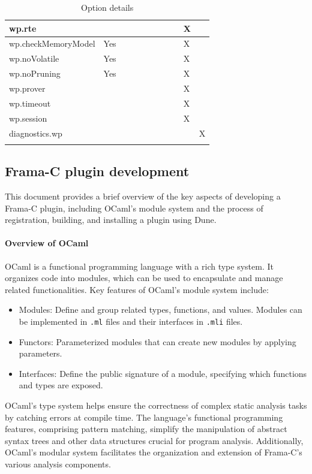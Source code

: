 \documentclass[10pt]{article}
\begin{document}
\begin{singlespace}
\begin{longtable}[H]{|l|l|l|l|p{0.2cm}|p{0.2cm}|p{0.2cm}|p{0.2cm}|p{0.2cm}|p{0.2cm}|p{0.2cm}|}
    wp.rte 									&     &   &   &   &   &   &   &   & X &   	\\ \hline
    wp.checkMemoryModel 					& Yes &   &   &   &   &   &   &   & X &   	\\ \hline
    wp.noVolatile 							& Yes &   &   &   &   &   &   &   & X &   	\\ \hline
    wp.noPruning 								& Yes &   &   &   &   &   &   &   & X &   	\\ \hline
    wp.prover 								&     &   &   &   &   &   &   &   & X &   	\\ \hline
    wp.timeout 								&     &   &   &   &   &   &   &   & X &   	\\ \hline
    wp.session 								&     &   &   &   &   &   &   &   & X &   	\\ \hline
	diagnostics.wp 							&     &   &   &   &   &   &   &   &   & X 	\\ \hline
	\caption{Option details}
    \label{tab:features-options-details}
\end{longtable}

\subsection{Frama-C plugin development}
This document provides a brief overview of the key aspects of developing a Frama-C plugin, including OCaml’s module system and the process of registration, building, and installing a plugin using Dune.

\paragraph*{Overview of OCaml}
OCaml is a functional programming language with a rich type system. It organizes code into modules, which can be used to encapsulate and manage related functionalities. Key features of OCaml’s module system include:

\begin{itemize}
    \item[--] Modules: Define and group related types, functions, and values. Modules can be implemented in \texttt{.ml} files and their interfaces in \texttt{.mli} files.
    \item[--] Functors: Parameterized modules that can create new modules by applying parameters.
    \item[--] Interfaces: Define the public signature of a module, specifying which functions and types are exposed.
\end{itemize}
OCaml's type system helps ensure the correctness of complex static analysis tasks by catching errors at compile time. The language's functional programming features, comprising pattern matching, simplify the manipulation of abstract syntax trees and other data structures crucial for program analysis. Additionally, OCaml’s modular system facilitates the organization and extension of Frama-C’s various analysis components.


\end{singlespace}
\end{document}
